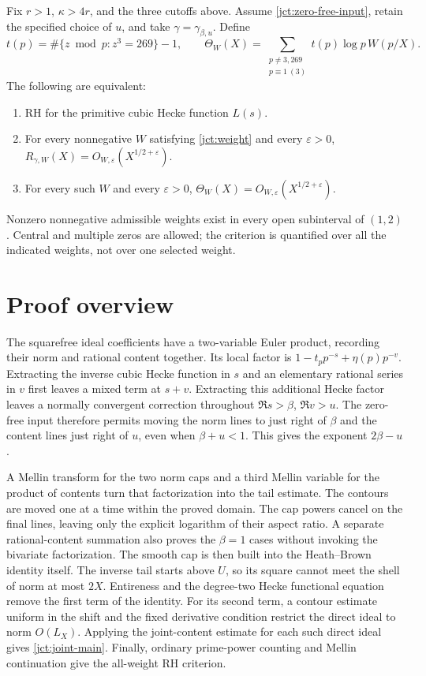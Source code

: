 \begin{theorem}
\label{jct:rh-theorem}
Fix \(r>1\), \(\kappa>4r\), and the three cutoffs above.
Assume \eqref{jct:zero-free-input}, retain the specified choice of
\(u\), and take \(\gamma=\gamma_{\beta,u}\). Define
\[
 t(p)=\#\{z\bmod p:z^3=269\}-1,\qquad
 \Theta_W(X)=\sum_{\substack{p\ne3,269\\p\equiv1\ (3)}}
 t(p)\log p\,W(p/X).
\]
The following are equivalent:
\begin{enumerate}
\item RH for the primitive cubic Hecke function \(L(s)\).
\item For every nonnegative \(W\) satisfying \eqref{jct:weight}
and every \(\varepsilon>0\),
\(R_{\gamma,W}(X)=O_{W,\varepsilon}(X^{1/2+\varepsilon})\).
\item For every such \(W\) and every \(\varepsilon>0\),
\(\Theta_W(X)=O_{W,\varepsilon}(X^{1/2+\varepsilon})\).
\end{enumerate}
Nonzero nonnegative admissible weights exist in every open
subinterval of \((1,2)\).  Central and multiple zeros are allowed;
the criterion is quantified over all the indicated weights,
not over one selected weight.
\end{theorem}

\section{Proof overview}
The squarefree ideal coefficients have a two-variable Euler product,
recording their norm and rational content together. Its local factor
is \(1-t_pp^{-s}+\eta(p)p^{-v}\). Extracting the inverse cubic
Hecke function in \(s\) and an elementary rational series in \(v\)
first leaves a mixed term at \(s+v\). Extracting this additional
Hecke factor leaves a normally
convergent correction throughout \(\Re s>\beta\), \(\Re v>u\).
The zero-free input therefore permits moving the norm lines to just
right of \(\beta\) and the content lines just right of \(u\),
even when \(\beta+u<1\). This gives the exponent \(2\beta-u\).

A Mellin transform for the two norm caps and a third Mellin variable
for the product of contents turn that factorization into the tail
estimate. The contours are moved one at a time within the proved
domain. The cap powers cancel on the final lines, leaving only the
explicit logarithm of their aspect ratio. A separate rational-content
summation also proves the \(\beta=1\) cases without invoking the
bivariate factorization.
The smooth cap is then built into the Heath--Brown identity itself.
The inverse tail starts above \(U\), so its square cannot meet
the shell of norm at most \(2X\).  Entireness and the degree-two
Hecke functional equation remove the first term of the identity.
For its second term, a contour estimate uniform in the shift
and the fixed derivative condition restrict the direct ideal to
norm \(O(L_X)\).  Applying the joint-content estimate for each
such direct ideal gives \eqref{jct:joint-main}.
Finally, ordinary prime-power counting and Mellin continuation
give the all-weight RH criterion.

